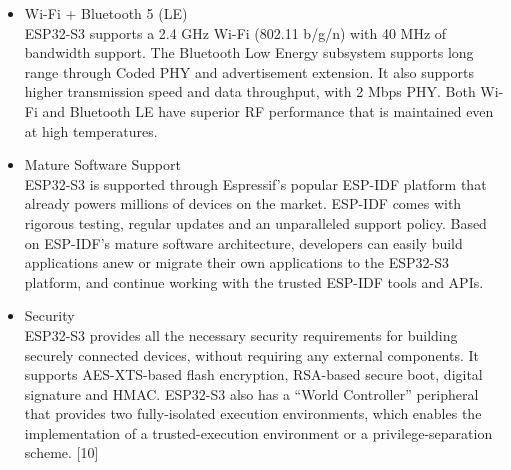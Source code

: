 \documentclass[conference]{IEEEtran}
\begin{document}
\begin{itemize}
\item Wi-Fi + Bluetooth 5 (LE)\\
ESP32-S3 supports a 2.4 GHz Wi-Fi (802.11 b/g/n) with 40 MHz of bandwidth support. The Bluetooth Low Energy subsystem supports long range through Coded PHY and advertisement extension. It also supports higher transmission speed and data throughput, with 2 Mbps PHY. Both Wi-Fi and Bluetooth LE have superior RF performance that is maintained even at high temperatures.\\
\item Mature Software Support\\
ESP32-S3 is supported through Espressif’s popular ESP-IDF platform that already powers millions of devices on the market. ESP-IDF comes with rigorous testing, regular updates and an unparalleled support policy. Based on ESP-IDF’s mature software architecture, developers can easily build applications anew or migrate their own applications to the ESP32-S3 platform, and continue working with the trusted ESP-IDF tools and APIs.\\
\item Security\\
ESP32-S3 provides all the necessary security requirements for building securely connected devices, without requiring any external components. It supports AES-XTS-based flash encryption, RSA-based secure boot, digital signature and HMAC. ESP32-S3 also has a “World Controller” peripheral that provides two fully-isolated execution environments, which enables the implementation of a trusted-execution environment or a privilege-separation scheme. [10]\\
\end{itemize}
\end{document}
